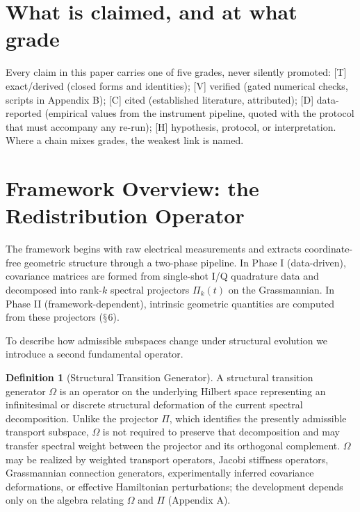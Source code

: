 \documentclass[11pt]{article}
\theoremstyle{definition}
\newtheorem{definition}{Definition}[section]
\theoremstyle{plain}
\begin{document}
\clearpage

\section{What is claimed, and at what grade}
\setcounter{section}{0}

Every claim in this paper carries one of five grades, never silently promoted:
[T] exact/derived (closed forms and identities); [V] verified (gated numerical
checks, scripts in Appendix B); [C] cited (established literature, attributed);
[D] data-reported (empirical values from the instrument pipeline, quoted with the
protocol that must accompany any re-run); [H] hypothesis, protocol, or
interpretation. Where a chain mixes grades, the weakest link is named.

\section{Framework Overview: the Redistribution Operator}

The framework begins with raw electrical measurements and extracts coordinate-free
geometric structure through a two-phase pipeline. In Phase I (data-driven),
covariance matrices are formed from single-shot I/Q quadrature data and decomposed
into rank-$k$ spectral projectors $\Pi_k(t)$ on the Grassmannian. In Phase II
(framework-dependent), intrinsic geometric quantities are computed from these
projectors ($\mathsection$6).

To describe how admissible subspaces change under structural evolution we introduce
a second fundamental operator.

\begin{definition}[Structural Transition Generator]
A structural transition generator $\Omega$ is an operator on the underlying Hilbert
space representing an infinitesimal or discrete structural deformation of the
current spectral decomposition. Unlike the projector $\Pi$, which identifies the
presently admissible transport subspace, $\Omega$ is not required to preserve that
decomposition and may transfer spectral weight between the projector and its
orthogonal complement. $\Omega$ may be realized by weighted transport operators,
Jacobi stiffness operators, Grassmannian connection generators, experimentally
inferred covariance deformations, or effective Hamiltonian perturbations; the
development depends only on the algebra relating $\Omega$ and $\Pi$ (Appendix A).
\end{definition}
\end{document}
